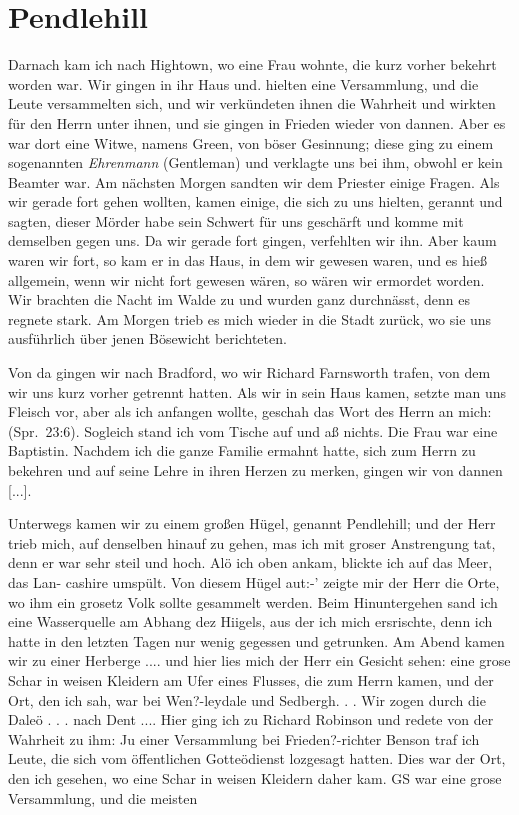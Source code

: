 \section{Pendlehill}

Darnach kam ich nach Hightown, wo eine 
Frau wohnte, die
kurz vorher bekehrt worden war. Wir gingen in ihr Haus und.
hielten eine Versammlung, und die Leute versammelten sich, und
wir verkündeten ihnen die Wahrheit und wirkten für den Herrn
unter ihnen, und sie gingen in Frieden wieder von dannen.
Aber es war dort eine Witwe, namens 
Green, von böser Gesinnung; 
diese ging zu einem sogenannten \textit{Ehrenmann} (Gentleman)
und verklagte uns bei ihm, obwohl er kein Beamter war. Am
nächsten Morgen sandten wir dem Priester einige Fragen. Als
wir gerade fort gehen wollten, kamen einige, die sich zu uns
hielten, gerannt und sagten, dieser Mörder habe sein Schwert
für uns geschärft und komme mit demselben gegen uns. Da wir
gerade fort gingen, verfehlten wir ihn. Aber kaum waren wir
fort, so kam er in das Haus, in dem wir gewesen waren, und
es hieß allgemein, wenn wir nicht fort gewesen wären, so wären
wir ermordet worden. Wir brachten die Nacht im Walde zu
und wurden ganz durchnässt, denn es regnete stark. Am Morgen
trieb es mich wieder in die Stadt zurück, wo sie uns ausführlich
über jenen Bösewicht berichteten.


Von da gingen wir nach Bradford, wo wir 
Richard Farnsworth trafen, von dem wir uns kurz vorher getrennt hatten.
Als wir in sein Haus kamen, setzte man uns Fleisch vor, aber als
ich anfangen wollte, geschah das Wort des Herrn 
an mich: 
(Spr.~23:6). Sogleich stand ich
vom Tische auf und aß nichts. Die Frau war eine 
Baptistin.
Nachdem ich die ganze Familie ermahnt hatte, sich zum Herrn
zu bekehren und auf seine Lehre in ihren Herzen zu merken,
gingen wir von dannen [...].

Unterwegs kamen wir zu einem großen Hügel, genannt 
Pendlehill; und der Herr trieb mich, 
auf denselben hinauf zu gehen,
mas ich mit groser Anstrengung tat, denn er war sehr steil und
hoch. Alö ich oben ankam, blickte ich auf das Meer, das Lan-
cashire umspült. Von diesem Hügel aut:-’ zeigte mir der Herr
die Orte, wo ihm ein grosetz Volk sollte gesammelt werden.
Beim Hinuntergehen sand ich eine Wasserquelle am Abhang
dez Hiigels, aus der ich mich ersrischte, denn ich hatte in den
letzten Tagen nur wenig gegessen und getrunken. Am Abend
kamen wir zu einer Herberge .... und hier lies mich der
Herr ein Gesicht sehen: eine grose Schar in weisen Kleidern
am Ufer eines Flusses, die zum Herrn kamen, und der Ort, den
ich sah, war bei Wen?-leydale und Sedbergh. . .
Wir zogen durch die Daleö . . . nach Dent .... Hier ging
ich zu Richard Robinson und redete von der Wahrheit zu ihm:
Ju einer Versammlung bei Frieden?-richter Benson traf ich Leute,
die sich vom öffentlichen Gotteödienst lozgesagt hatten. Dies
war der Ort, den ich gesehen, wo eine Schar in weisen Kleidern
daher kam. GS war eine grose Versammlung, und die meisten



